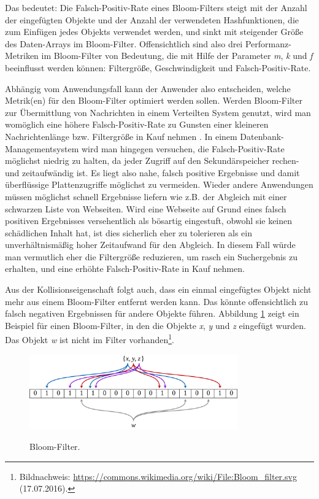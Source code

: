 Das bedeutet: Die Falsch-Positiv-Rate eines Bloom-Filters steigt mit der Anzahl der eingefügten Objekte und der Anzahl der verwendeten Hashfunktionen, die zum Einfügen jedes Objekts verwendet werden, und sinkt mit steigender Größe des Daten-Arrays im Bloom-Filter. Offensichtlich sind also drei Performanz-Metriken im Bloom-Filter von Bedeutung, die mit Hilfe der Parameter \textit{m}, \textit{k} und \textit{f} beeinflusst werden können: Filtergröße, Geschwindigkeit und Falsch-Positiv-Rate.  

Abhängig vom Anwendungsfall kann der Anwender also entscheiden, welche Metrik(en) für den Bloom-Filter optimiert werden sollen. Werden Bloom-Filter zur Übermittlung von Nachrichten in einem Verteilten System genutzt, wird man womöglich eine höhere Falsch-Positiv-Rate zu Gunsten einer kleineren Nachrichtenlänge bzw. Filtergröße in Kauf nehmen \cite{Mitzenmacher2002}. In einem Datenbank-Managementsystem wird man hingegen versuchen, die Falsch-Positiv-Rate möglichst niedrig zu halten, da jeder Zugriff auf den Sekundärspeicher rechen- und zeitaufwändig ist. Es liegt also nahe, falsch positive Ergebnisse und damit überflüssige Plattenzugriffe möglichst zu vermeiden. Wieder andere Anwendungen müssen möglichst schnell Ergebnisse liefern wie z.B. der Abgleich mit einer schwarzen Liste von Webseiten. Wird eine Webseite auf Grund eines falsch positiven Ergebnisses versehentlich als bösartig eingestuft, obwohl sie keinen schädlichen Inhalt hat, ist dies sicherlich eher zu tolerieren als ein unverhältnismäßig hoher Zeitaufwand für den Abgleich. In diesem Fall würde man vermutlich eher die Filtergröße reduzieren, um rasch ein Suchergebnis zu erhalten, und eine erhöhte Falsch-Positiv-Rate in Kauf nehmen. 

Aus der Kollisionseigenschaft folgt auch, dass ein einmal eingefügtes Objekt nicht mehr aus einem Bloom-Filter entfernt werden kann. Das könnte offensichtlich zu falsch negativen Ergebnissen für andere Objekte führen. Abbildung \ref{fig:pic0} zeigt ein Beispiel für einen Bloom-Filter, in den die Objekte \textit{x}, \textit{y} und \textit{z} eingefügt wurden. Das Objekt \textit{w} ist nicht im Filter vorhanden\footnote{Bildnachweis: \url{https://commons.wikimedia.org/wiki/File:Bloom_filter.svg} (17.07.2016).}.
\begin{figure}[hpbt]
  \centering
  \includegraphics[width=0.8\textwidth]{pictures/1280px-Bloom_filter.png}\\
  \caption[Bloom-Filter]{Bloom-Filter.}\label{fig:pic0}
\end{figure}
